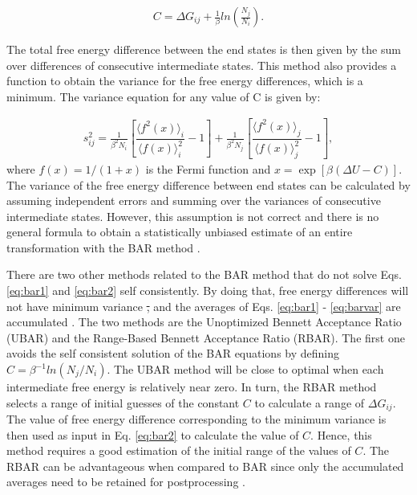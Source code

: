 \documentclass[
	12pt,				%
	openany,			%
	oneside,			%
	a4paper,			%
	english,			%
	brazil				%
	]{abntex2}
\providecommand{\DIFdel}[1]{{\protect\color{red}\sout{#1}}}
\providecommand{\DIFdelbegin}{}
\providecommand{\DIFdelend}{}
\providecommand{\DIFdel}[1]{{\protect\color{red}\sout{#1}}}                      %
\providecommand{\DIFdelbegin}{} %
\providecommand{\DIFdelend}{} %
\begin{document}
\begin{equation}
\label{eq:bar2}
\begin{aligned}
C = \Delta G_{ij} + \frac{1}{\beta}ln\left(\frac{N_{j}}{N_{i}}\right).
\end{aligned}
\end{equation}

The total free energy difference between the end states is then given by the sum over differences of consecutive intermediate states. This method also provides a function to obtain the variance for the free energy differences, which is a minimum. The variance equation for any value of C is given by:

\begin{equation}
\label{eq:barvar}
\begin{aligned}
s_{ij}^{2} = \frac{1}{\beta^{2} N_{i}} \left[\dfrac{\langle{f^{2}(x)}\rangle_{i}}{\langle{f(x)}\rangle^{2}_{i}} - 1\right] + \frac{1}{\beta^{2} N_{j}} \left[\dfrac{\langle{f^{2}(x)}\rangle_{j}}{\langle{f(x)}\rangle^{2}_{j}} - 1\right],
\end{aligned}
\end{equation}
where $f(x)=1/(1+x)$ is the Fermi function and $x=\exp[\beta(\Delta U - C)]$. The variance of the free energy difference between end states can be calculated by assuming independent errors and summing over the variances of consecutive intermediate states. However, this assumption is not correct and there is no general formula to obtain a statistically unbiased estimate of an entire transformation with the BAR method \cite{bareva}. 

There are two other methods related to the BAR method that do not solve Eqs. \eqref{eq:bar1} and \eqref{eq:bar2} self consistently. By doing that, free energy differences will not have minimum variance \DIFdelbegin \DIFdel{, }\DIFdelend and the averages of Eqs. \eqref{eq:bar1} - \eqref{eq:barvar} are accumulated \cite{bareva}. The two methods are the Unoptimized Bennett Acceptance Ratio (UBAR) and the Range-Based Bennett Acceptance Ratio (RBAR). The first one avoids the self consistent solution of the BAR equations by defining $C=\beta^{-1}ln(N_{j}/N_{i})$. The UBAR method will be close to optimal when each intermediate free energy is relatively near zero. In turn, the RBAR method selects a range of initial guesses of the constant $C$ to calculate a range of $\Delta G_{ij}$. The value of free energy difference corresponding to the minimum variance is then used as input in Eq. \eqref{eq:bar2} to calculate the value of $C$. Hence, this method requires a good estimation of the initial range of the values of $C$. The RBAR can be advantageous when compared to BAR since only the accumulated averages need to be retained for postprocessing \cite{bareva}.  
\end{document}
